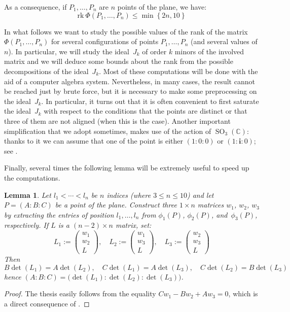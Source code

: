 \documentclass[11pt, a4paper, reqno, captions=tableheading,bibliography=totoc]{scrartcl}
\theoremstyle{plain}
\newtheorem{lemma}{Lemma}[section]
\theoremstyle{definition}
\newcommand{\C}{\mathbb{C}}
\newcommand{\SO}{\operatorname{SO}}
\newcommand{\iii}{\textbf{i}}
\newcommand{\rk}{\ensuremath{\mathrm{rk}}}
\begin{document}
As a consequence, if $P_1, \dots, P_n$ are $n$ points of the plane, we have:
\begin{equation}
\label{bound_rank}
\rk  \  \Phi(P_1, \dots, P_n) \leq \min \left\{2n, 10 \right\}
\end{equation}

In what follows we want to study the possible values of the rank of the matrix
$\Phi(P_1, \dots, P_n)$ for several configurations of points $P_1, \dots, P_n$
(and several values of $n$).
In particular, we will study the ideal~$J_k$ of order $k$ minors of the
involved matrix and we will deduce some bounds about the rank from the possible
decompositions of the ideal~$J_k$. Most of these computations will be done
with the aid of a computer algebra system. Nevertheless, in many cases,
the result cannot be reached just by brute force, but it is necessary to
make some preprocessing on the ideal~$J_k$. In particular, it turns out that
it is often convenient to first saturate the ideal~$J_k$ with respect to
the conditions that the
points are distinct or that three of them are not aligned (when this is the
case). Another important simplification that we adopt sometimes, makes use
of the action of $\SO_3(\C)$: thanks to it we can assume that one of
the point is either $(1: 0: 0)$ or $(1: \iii: 0)$; see .

Finally, several times the following lemma will be extremely useful
to speed up the computations.

\begin{lemma}
\label{lemma:minors}
Let $l_1 < \cdots <l_n$ be $n$ indices (where $3 \leq n \leq 10$) and let $P = (A: B: C)$ be a point of the plane.
Construct three $1 \times n$ matrices $w_1$, $w_2$, $w_3$ by extracting the entries of position $l_1, \dotsc, l_n$ from $\phi_1(P)$, $\phi_2(P)$, and~$\phi_3(P)$, respectively. If $L$ is a $(n-2) \times n$ matrix, set:
  \[
  L_1 := \left(\begin{array}{c}w_1 \\ w_2 \\ L\end{array}  \right), \quad
  L_2 := \left(\begin{array}{c}w_1 \\ w_3 \\ L\end{array}  \right), \quad
  L_3 := \left(\begin{array}{c}w_2 \\ w_3 \\ L\end{array}  \right)
  \]
  Then
  \[
  B \det(L_1) = A \det(L_2), \quad
  C \det(L_1) = A \det(L_3), \quad
  C \det(L_2) = B \det(L_3)
  \]
  hence $(A: B: C) = \bigl( \det(L_1): \det(L_2): \det(L_3) \bigr)$.
\end{lemma}
\begin{proof}
  The thesis easily follows from the equality $C w_1 - B w_2 + A w_3 = 0$, which is a direct consequence of .
\end{proof}
\end{document}

